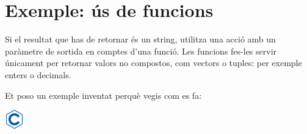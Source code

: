 \documentclass[]{book}
\begin{document}
\section{Exemple: ús de funcions}\label{exemple-us-de-funcions}

Si el resultat que has de retornar és un string, utilitza una acció amb
un paràmetre de sortida en comptes d'una funció. Les funcions fes-les
servir únicament per retornar valors no compostos, com vectors o tuples:
per exemple enters o decimals.

Et poso un exemple inventat perquè vegis com es fa:

\includegraphics{./img/c.png}
\end{document}
